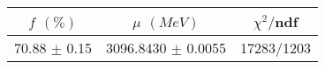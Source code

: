 \begin{tabular}{c|c||c}
 $f$ $(\%)$ & $\mu$ $(MeV)$ & $\chi^2/$ndf \\
\hline
70.88 $\pm$ 0.15 & 3096.8430 $\pm$ 0.0055 & 17283/1203\\
\end{tabular}
